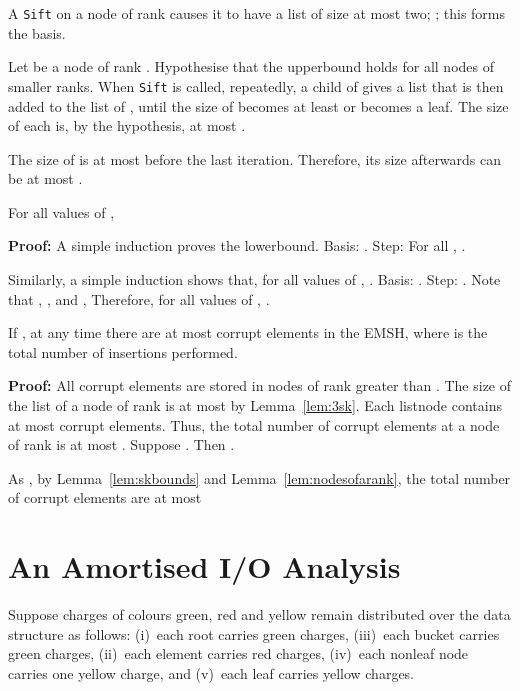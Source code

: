 A {\tt Sift} on a node of rank  causes it to have a list of size at most two;
; this forms the basis. 

Let  be a node of rank . Hypothesise that the upperbound
holds for all nodes of smaller ranks. When {\tt Sift} is called,
repeatedly, a child of  gives  a list  that is then added to the list  of ,
until the size of  becomes at least  or  becomes a leaf.
The size of each  is, by the hypothesis, at most .




The size of  is at most  before the last iteration.
Therefore, its size afterwards can be at most . 
\hfill 


\begin{lemma}
\label{lem:skbounds}
For all values of ,

\end{lemma}

{\bf Proof:}
A simple induction proves the lowerbound. 
Basis: .
Step: For all , .

Similarly, a simple induction shows that, 
for all values of , .
Basis: .
Step: .
Note that
,
, and
,
Therefore, for all values of , .
 \hfill 



\begin{lemma}
If , at any time there are at most  corrupt elements in the EMSH,
where  is the total number of insertions performed.
\end{lemma}
{\bf Proof:}
All corrupt elements are stored in nodes of rank greater than .
The size of the list of a node of rank  is
    at most  by Lemma~\ref{lem:3sk}.
Each listnode contains at most  corrupt elements.
Thus, the total number of corrupt elements at a node of rank 
	is at most .
Suppose . Then .

As , 
by Lemma~\ref{lem:skbounds} and Lemma~\ref{lem:nodesofarank},
the total number of
corrupt elements are at most

\hfill 


\section{An Amortised I/O Analysis}
\label{analy:emsh}

Suppose charges of colours green, red and yellow remain distributed over the
data structure as follows: (i)~each root carries   green charges,
(iii)~each bucket carries  green charges,
(ii)~each element carries  red charges,
(iv)~each nonleaf node carries one yellow charge, and
(v)~each leaf carries  yellow charges.


